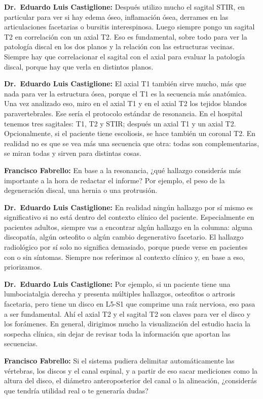 \noindent\textbf{Dr.~Eduardo Luis Castiglione:} Después utilizo mucho el sagital STIR, en particular para ver si hay edema óseo, inflamación ósea, derrames en las articulaciones facetarias o bursitis interespinosa. Luego siempre pongo un sagital T2 en correlación con un axial T2. Eso es fundamental, sobre todo para ver la patología discal en los dos planos y la relación con las estructuras vecinas. Siempre hay que correlacionar el sagital con el axial para evaluar la patología discal, porque hay que verla en distintos planos.

\noindent\textbf{Dr.~Eduardo Luis Castiglione:} El axial T1 también sirve mucho, más que nada para ver la estructura ósea, porque el T1 es la secuencia más anatómica. Una vez analizado eso, miro en el axial T1 y en el axial T2 los tejidos blandos paravertebrales. Ese sería el protocolo estándar de resonancia. En el hospital tenemos tres sagitales: T1, T2 y STIR; después un axial T1 y un axial T2. Opcionalmente, si el paciente tiene escoliosis, se hace también un coronal T2. En realidad no es que se vea más una secuencia que otra: todas son complementarias, se miran todas y sirven para distintas cosas.

\noindent\textbf{Francisco Fabrello:} En base a la resonancia, ¿qué hallazgo considerás más importante a la hora de redactar el informe? Por ejemplo, el peso de la degeneración discal, una hernia o una protrusión.

\noindent\textbf{Dr.~Eduardo Luis Castiglione:} En realidad ningún hallazgo por sí mismo es significativo si no está dentro del contexto clínico del paciente. Especialmente en pacientes adultos, siempre vas a encontrar algún hallazgo en la columna: alguna discopatía, algún osteofito o algún cambio degenerativo facetario. El hallazgo radiológico por sí solo no significa demasiado, porque puede verse en pacientes con o sin síntomas. Siempre nos referimos al contexto clínico y, en base a eso, priorizamos.

\noindent\textbf{Dr.~Eduardo Luis Castiglione:} Por ejemplo, si un paciente tiene una lumbociatalgia derecha y presenta múltiples hallazgos, osteofitos o artrosis facetaria, pero tiene un disco en L5-S1 que comprime una raíz nerviosa, eso pasa a ser fundamental. Ahí el axial T2 y el sagital T2 son claves para ver el disco y los forámenes. En general, dirigimos mucho la visualización del estudio hacia la sospecha clínica, sin dejar de revisar toda la información que aportan las secuencias.

\noindent\textbf{Francisco Fabrello:} Si el sistema pudiera delimitar automáticamente las vértebras, los discos y el canal espinal, y a partir de eso sacar mediciones como la altura del disco, el diámetro anteroposterior del canal o la alineación, ¿considerás que tendría utilidad real o te generaría dudas?

